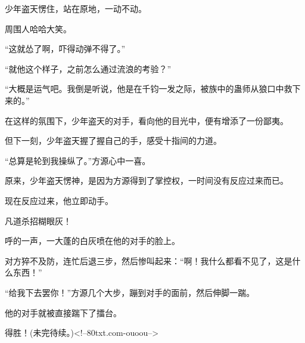 \begin{this_body}
少年盗天愣住，站在原地，一动不动。

周围人哈哈大笑。

“这就怂了啊，吓得动弹不得了。”

“就他这个样子，之前怎么通过流浪的考验？”

“大概是运气吧。我倒是听说，他是在千钧一发之际，被族中的蛊师从狼口中救下来的。”

在这样的氛围下，少年盗天的对手，看向他的目光中，便有增添了一份鄙夷。

但下一刻，少年盗天握了握自己的手，感受十指间的力道。

“总算是轮到我操纵了。”方源心中一喜。

原来，少年盗天愣神，是因为方源得到了掌控权，一时间没有反应过来而已。

现在反应过来，他立即动手。

凡道杀招糊眼灰！

呼的一声，一大蓬的白灰喷在他的对手的脸上。

对方猝不及防，连忙后退三步，然后惨叫起来：“啊！我什么都看不见了，这是什么东西！”

“给我下去罢你！”方源几个大步，蹦到对手的面前，然后伸脚一踹。

他的对手就被直接踹下了擂台。

得胜！(未完待续。)<!--80txt.com-ouoou-->

\end{this_body}

